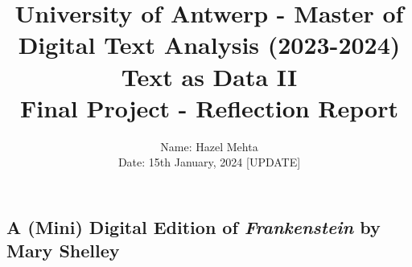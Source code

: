 \documentclass[14pt]{article}
\title{\large University of Antwerp - Master of Digital Text Analysis (2023-2024)\\ \Large Text as Data II\\Final Project - Reflection Report}
\author{Name: Hazel Mehta\\ Date: 15th January, 2024 [UPDATE]}
\date{}
\begin{document}
\maketitle

\begin{center}
\section*{A (Mini) Digital Edition of \emph{Frankenstein} by Mary Shelley}
\end{center}
\end{document}
